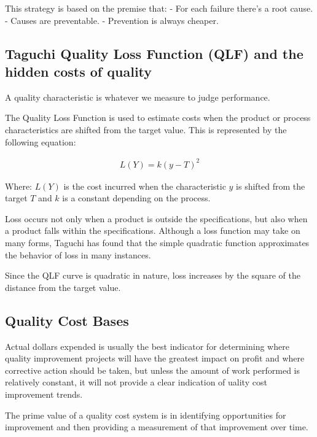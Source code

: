 \documentclass[11pt]{article}
\begin{document}
This strategy is based on the premise that: - For each failure there's a
root cause. - Causes are preventable. - Prevention is always cheaper.

\hypertarget{taguchi-quality-loss-function-qlf-and-the-hidden-costs-of-quality}{%
\subsection{Taguchi Quality Loss Function (QLF) and the hidden costs of
quality}\label{taguchi-quality-loss-function-qlf-and-the-hidden-costs-of-quality}}

A quality characteristic is whatever we measure to judge performance.

The Quality Loss Function is used to estimate costs when the product or
process characteristics are shifted from the target value. This is
represented by the following equation:

\begin{gather}
  L(Y) = k(y-T)^2
\end{gather}

Where: \(L(Y)\) is the cost incurred when the characteristic \(y\) is
shifted from the target \(T\) and \(k\) is a constant depending on the
process.

Loss occurs not only when a product is outside the specifications, but
also when a product falls within the specifications. Although a loss
function may take on many forms, Taguchi has found that the simple
quadratic function approximates the behavior of loss in many instances.

Since the QLF curve is quadratic in nature, loss increases by the square
of the distance from the target value.

\hypertarget{quality-cost-bases}{%
\subsection{Quality Cost Bases}\label{quality-cost-bases}}

Actual dollars expended is usually the best indicator for determining
where quality improvement projects will have the greatest impact on
profit and where corrective action should be taken, but unless the
amount of work performed is relatively constant, it will not provide a
clear indication of uality cost improvement trends.

The prime value of a quality cost system is in identifying opportunities
for improvement and then providing a measurement of that improvement
over time.
\end{document}
